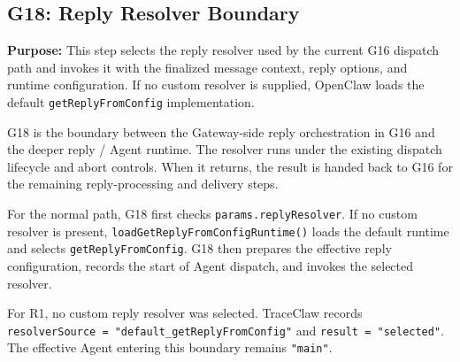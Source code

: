
\subsection*{G18: Reply Resolver Boundary}

\textbf{Purpose:}
This step selects the reply resolver used by the current G16 dispatch
path and invokes it with the finalized message context, reply options,
and runtime configuration. If no custom resolver is supplied, OpenClaw
loads the default \texttt{getReplyFromConfig} implementation.

G18 is the boundary between the Gateway-side reply orchestration in G16
and the deeper reply / Agent runtime. The resolver runs under the
existing dispatch lifecycle and abort controls. When it returns, the
result is handed back to G16 for the remaining reply-processing and
delivery steps.

For the normal path, G18 first checks
\texttt{params.replyResolver}. If no custom resolver is present,
\texttt{loadGetReplyFromConfigRuntime()} loads the default runtime and
selects \texttt{getReplyFromConfig}. G18 then prepares the effective
reply configuration, records the start of Agent dispatch, and invokes
the selected resolver.

For R1, no custom reply resolver was selected. TraceClaw records
\texttt{resolverSource = "default\_getReplyFromConfig"} and
\texttt{result = "selected"}. The effective Agent entering this
boundary remains \texttt{"main"}.


